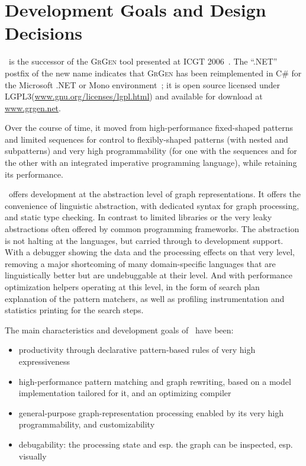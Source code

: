 \chapter{Development Goals and Design Decisions}\label{chp:designgoals}

\GrG~is the successor of the \textsc{GrGen} tool presented at ICGT 2006~\cite{GBGHS:06}.
The ``.NET'' postfix of the new name indicates that \textsc{GrGen} has been reimplemented in C\# for the Microsoft .NET or Mono environment~\cite{NET,MONO};
it is open source licensed under LGPL3(\url{www.gnu.org/licenses/lgpl.html}) and available for download at \url{www.grgen.net}.

Over the course of time, it moved from high-performance fixed-shaped patterns and limited sequences for control to flexibly-shaped patterns (with nested and subpatterns) and very high programmability (for one with the sequences and for the other with an integrated imperative programming language), while retaining its performance.

\GrG\ offers development at the abstraction level of graph representations.
It offers the convenience of linguistic abstraction, with dedicated syntax for graph processing, and static type checking.
In contrast to limited libraries or the very leaky abstractions often offered by common programming frameworks.
The abstraction is not halting at the languages, but carried through to development support.
With a debugger showing the data and the processing effects on that very level,
removing a major shortcoming of many domain-specific languages that are linguistically better but are undebuggable at their level.
And with performance optimization helpers operating at this level, in the form of search plan explanation of the pattern matchers, as well as profiling instrumentation and statistics printing for the search steps.

The main characteristics and development goals of \GrG\ have been:
\begin{itemize}
	\item productivity through declarative pattern-based rules of very high expressiveness
	\item high-performance pattern matching and graph rewriting, based on a model implementation tailored for it, and an optimizing compiler
	\item general-purpose graph-representation processing enabled by its very high programmability, and customizability
	\item debugability: the processing state and esp. the graph can be inspected, esp. visually
\end{itemize}

